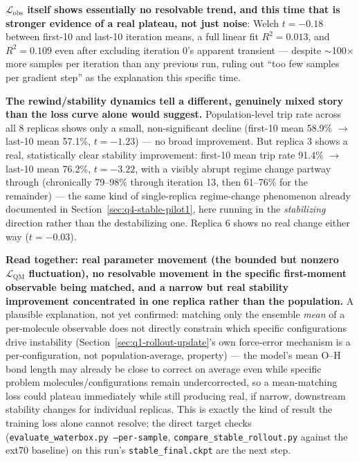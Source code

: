 \documentclass[11pt]{article}
\begin{document}
\textbf{$\mathcal{L}_{\text{obs}}$ itself shows essentially no resolvable
trend, and this time that is stronger evidence of a real plateau, not just
noise}: Welch $t=-0.18$ between first-10 and last-10 iteration means, a
full linear fit $R^2=0.013$, and $R^2=0.109$ even after excluding
iteration 0's apparent transient --- despite $\sim$100$\times$ more samples
per iteration than any previous run, ruling out ``too few samples per
gradient step'' as the explanation this specific time.

\textbf{The rewind/stability dynamics tell a different, genuinely mixed
story than the loss curve alone would suggest.} Population-level trip rate
across all 8 replicas shows only a small, non-significant decline
(first-10 mean 58.9\% $\to$ last-10 mean 57.1\%, $t=-1.23$) --- no broad
improvement. But replica 3 shows a real, statistically clear stability
improvement: first-10 mean trip rate 91.4\% $\to$ last-10 mean 76.2\%,
$t=-3.22$, with a visibly abrupt regime change partway through (chronically
79--98\% through iteration 13, then 61--76\% for the remainder) ---
the same kind of single-replica regime-change phenomenon already
documented in Section~\ref{sec:q4-stable-pilot1}, here running in the
\emph{stabilizing} direction rather than the destabilizing one. Replica 6
shows no real change either way ($t=-0.03$).

\textbf{Read together: real parameter movement (the bounded but nonzero
$\mathcal{L}_{\text{QM}}$ fluctuation), no resolvable movement in the
specific first-moment observable being matched, and a narrow but real
stability improvement concentrated in one replica rather than the
population.} A plausible explanation, not yet confirmed: matching only the
ensemble \emph{mean} of a per-molecule observable does not directly
constrain which specific configurations drive instability
(Section~\ref{sec:q1-rollout-update}'s own force-error mechanism is a
per-configuration, not population-average, property) --- the model's mean
O--H bond length may already be close to correct on average even while
specific problem molecules/configurations remain undercorrected, so a
mean-matching loss could plateau immediately while still producing real,
if narrow, downstream stability changes for individual replicas. This is
exactly the kind of result the training loss alone cannot resolve; the
direct target checks (\texttt{evaluate\_waterbox.py --per-sample},
\texttt{compare\_stable\_rollout.py} against the ext70 baseline) on this
run's \texttt{stable\_final.ckpt} are the next step.
\end{document}
